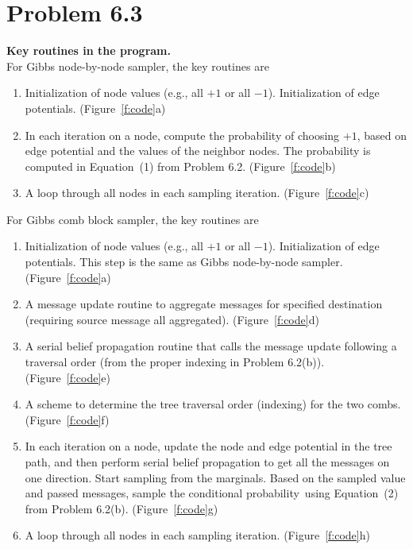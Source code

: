 \documentclass{article}
\begin{document}
\section*{Problem 6.3}
%
\textbf{Key routines in the program.}
\\

%
\noindent
For Gibbs node-by-node sampler, the key routines are 
\begin{enumerate}
	\item Initialization of node values (e.g., all $+1$ or all $-1$). Initialization of edge potentials. (Figure~\ref{f:code}a)
	\item In each iteration on a node, compute the probability of choosing $+1$, based on edge potential
	  	  and the values of the neighbor nodes. The probability is computed
	  	  in Equation~(1) from Problem 6.2. (Figure~\ref{f:code}b)
	\item A loop through all nodes in each sampling iteration. (Figure~\ref{f:code}c)
\end{enumerate}
%
For Gibbs comb block sampler, the key routines are
\begin{enumerate}
	\item Initialization of node values (e.g., all $+1$ or all $-1$). Initialization of edge potentials. This
	      step is the same as Gibbs node-by-node sampler. (Figure~\ref{f:code}a)
	\item A message update routine to aggregate messages for specified destination (requiring source message all aggregated). 
	      (Figure~\ref{f:code}d)
	\item A serial belief propagation routine that calls the message update following a traversal order
	      (from the proper indexing in Problem 6.2(b)). (Figure~\ref{f:code}e)
	\item A scheme to determine the tree traversal order (indexing) for the two combs. (Figure~\ref{f:code}f)
	\item In each iteration on a node, update the node and edge potential in the tree path, and then
	      perform serial belief propagation to get all the messages on one direction.
	      Start sampling from the marginals. Based on the sampled value and passed messages,
	      sample the conditional probability using Equation~(2) from Problem 6.2(b). (Figure~\ref{f:code}g)
	\item A loop through all nodes in each sampling iteration. (Figure~\ref{f:code}h)\\
\end{enumerate}
\end{document}
